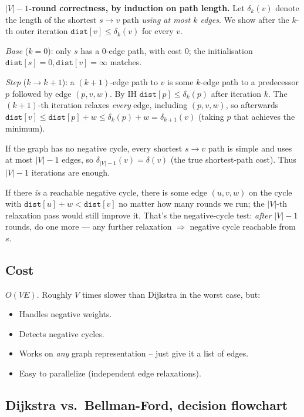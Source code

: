\documentclass[11pt]{article}
\begin{document}
\begin{notebox}
\textbf{$|V|-1$-round correctness, by induction on path length.} Let
$\delta_k(v)$ denote the length of the shortest $s \to v$ path
\emph{using at most $k$ edges}. We show after the $k$-th outer
iteration $\texttt{dist}[v] \le \delta_k(v)$ for every $v$.

\emph{Base} ($k = 0$): only $s$ has a $0$-edge path, with cost $0$;
the initialisation $\texttt{dist}[s] = 0, \texttt{dist}[v] = \infty$
matches.

\emph{Step} ($k \to k{+}1$): a $(k{+}1)$-edge path to $v$ is some
$k$-edge path to a predecessor $p$ followed by edge $(p, v, w)$. By
IH $\texttt{dist}[p] \le \delta_k(p)$ after iteration $k$. The
$(k{+}1)$-th iteration relaxes \emph{every} edge, including
$(p, v, w)$, so afterwards
$\texttt{dist}[v] \le \texttt{dist}[p] + w \le \delta_k(p) + w
= \delta_{k+1}(v)$ (taking $p$ that achieves the minimum).

If the graph has no negative cycle, every shortest $s \to v$ path
is simple and uses at most $|V| - 1$ edges, so
$\delta_{|V|-1}(v) = \delta(v)$ (the true shortest-path cost). Thus
$|V| - 1$ iterations are enough.

If there \emph{is} a reachable negative cycle, there is some edge
$(u, v, w)$ on the cycle with
$\texttt{dist}[u] + w < \texttt{dist}[v]$ no matter how many rounds
we run; the $|V|$-th relaxation pass would still improve it. That's
the negative-cycle test: \emph{after} $|V| - 1$ rounds, do one
more --- any further relaxation $\Rightarrow$ negative cycle
reachable from $s$.
\end{notebox}

\subsection*{Cost}

$O(VE)$. Roughly $V$ times slower than Dijkstra in the worst case, but:

\begin{itemize}[leftmargin=*]
    \item Handles negative weights.
    \item Detects negative cycles.
    \item Works on \emph{any} graph representation -- just give it a list of edges.
    \item Easy to parallelize (independent edge relaxations).
\end{itemize}

\subsection*{Dijkstra vs.\ Bellman-Ford, decision flowchart}
\end{document}
